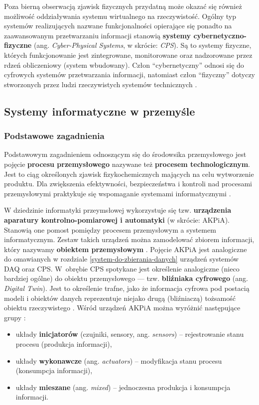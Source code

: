 \documentclass[a4paper, 12pt, twoside]{article}
\begin{document}
Poza bierną obserwacją zjawisk fizycznych przydatną może okazać się również
możliwość oddziaływania systemu wirtualnego na rzeczywistość. Ogólny typ systemów
realizujących nazwane funkcjonalności opierające się ponadto na zaawansowanym przetwarzaniu informacji
stanowią \textbf{systemy cybernetyczno-fizyczne}
(ang. \emph{Cyber-Physical Systems}, w skrócie: \emph{CPS}).
Są to systemy fizyczne, których funkcjonowanie jest zintegrowane, monitorowane oraz 
nadzorowane przez rdzeń obliczeniowy (system wbudowany). Człon ``cybernetyczny'' odnosi
się do cyfrowych systemów przetwarzania informacji, natomiast człon ``fizyczny'' 
dotyczy stworzonych przez ludzi rzeczywistych systemów technicznych \cite{iiot-cyber-manufacturing-systems}. 

\subsection{Systemy informatyczne w przemyśle} \label{isp}

\subsubsection{Podstawowe zagadnienia}

Podstawowym zagadnieniem odnoszącym się do środowsika przemysłowego jest pojęcie
\textbf{procesu przemysłowego} nazywane też \textbf{procesem technologicznym}.
Jest to ciąg określonych zjawisk fizykochemicznych mających na celu wytworzenie
produktu. Dla zwiększenia efektywności, bezpieczeństwa i kontroli nad procesami
przemysłowymi praktykuje się wspomaganie systemami informatycznymi \cite{isp}.

W dziedzinie informatyki przeymsłowej wykorzystuje się tzw.
\textbf{urządzenia aparatury kontrolno-pomiarowej i automatyki} (w skrócie: AKPiA). 
Stanowią one pomost pomiędzy procesem przemysłowym a systemem informatycznym. 
Zestaw takich urządzeń można zamodelować zbiorem informacji, który nazywamy
\textbf{obiektem przemysłowym} \cite{isp}. Pojęcie AKPiA jest analogiczne do omawianych
w rozdziale \ref{system-do-zbierania-danych} urządzeń systemów DAQ oraz CPS. W~obrębie
CPS spotykane jest określenie analogiczne (nieco bardziej ogólne) do obiektu przemysłowego --- 
tzw. \textbf{bliźniaka cyfrowego} (ang. \emph{Digital Twin}). 
Jest to określenie trafne, jako że informacja cyfrowa pod postacią modeli i obiektów
danych reprezentuje niejako drugą (bliźniaczą) tożsamość obiektu rzeczywistego 
\cite{iiot-challenges-opportunities-directions}. 
Wśród urządzeń AKPiA można wyróżnić następujące grupy \cite{isp}:
\begin{itemize}
    \itemsep0em 
    \item układy \textbf{inicjatorów} (czujniki, sensory, ang. \emph{sensors}) -- rejestrowanie stanu procesu (produkcja informacji),
    \item układy \textbf{wykonawcze} (ang. \emph{actuators}) -- modyfikacja stanu procesu (konsumpcja informacji),
    \item układy \textbf{mieszane} (ang. \emph{mixed}) -- jednoczesna produkcja i konsumpcja informacji.
\end{itemize}
\end{document}
